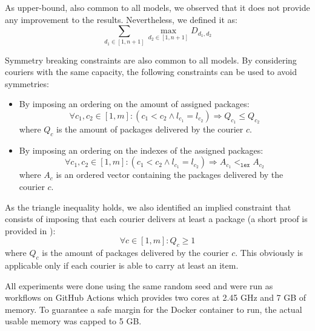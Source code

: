 \documentclass{article}
\begin{document}
    As upper-bound, also common to all models, we observed that it does not provide any improvement to the results. Nevertheless, we defined it as:
    \begin{equation}
        \sum_{d_1 \in [1, n+1]} \max_{d_2 \in [1, n+1]} D_{d_1, d_2}
    \end{equation}

    Symmetry breaking constraints are also common to all models. By considering couriers with the same capacity, the following constraints can be used to avoid symmetries:
    \begin{itemize}
        \item By imposing an ordering on the amount of assigned packages:
            \begin{equation}
                \label{eq:cp_symm_amount}
                \forall c_1, c_2 \in [1, m]: (c_1 < c_2 \land l_{c_1} = l_{c_2}) \Rightarrow Q_{c_1} \leq Q_{c_2}
            \end{equation}
            where $Q_c$ is the amount of packages delivered by the courier $c$.
        \item By imposing an ordering on the indexes of the assigned packages:
            \begin{equation}
                \label{eq:cp_symm_packs}
                \forall c_1, c_2 \in [1, m]: (c_1 < c_2 \land l_{c_1} = l_{c_2}) \Rightarrow A_{c_1} <_\texttt{lex} A_{c_2}
            \end{equation}
            where $A_c$ is an ordered vector containing the packages delivered by the courier $c$.
    \end{itemize}

    As the triangle inequality holds, we also identified an implied constraint that consists of imposing that each courier delivers at least a package (a short proof is provided in ):
    \begin{equation}
        \label{eq:impl_constr}
        \forall c \in [1, m]: Q_c \geq 1  
    \end{equation}
    where $Q_c$ is the amount of packages delivered by the courier $c$.
    This obviously is applicable only if each courier is able to carry at least an item.

    All experiments were done using the same random seed and were run as workflows on GitHub Actions which provides two cores at 2.45 GHz and 7 GB of memory. To guarantee a safe margin for the Docker container to run, the actual usable memory was capped to 5 GB.
\end{document}
